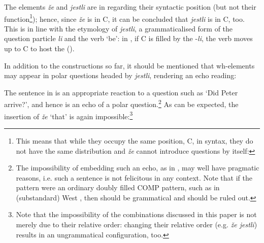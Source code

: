 \documentclass[output=paper,modfonts, hidelinks, newtxmath]{langscibook}
\begin{document}
\noindent The elements \textit{že} and \textit{jestli} are in  regarding their syntactic position (but not their function\footnote{This means that while they occupy the same position, C, in syntax, they do not have the same distribution and \textit{že} cannot introduce questions by itself:

\z 

}); hence, since \textit{že} is in C, it can be concluded that \textit{jestli} is in C, too. This is in line with the etymology of \textit{jestli}, a grammaticalised form of the question particle \textit{li} and the verb `be': in , if C is filled by the  -\textit{li}, the verb moves up to C to host the  (\citealt{schwabe2004}).

In addition to the constructions so far, it should be mentioned that wh-elements may appear in polar questions headed by \textit{jestli}, rendering an echo reading:

\ea
	\z 
\z 

\noindent The sentence in  is an appropriate reaction to a question such as `Did Peter arrive?', and hence is an echo of a polar question.\footnote{The impossibility of embedding such an echo, as in , may well have pragmatic reasons, i.e. such a sentence is not felicitous in any context. Note that if the  pattern were an ordinary doubly filled COMP pattern, such as in (substandard) West , then  should be grammatical and  should be ruled out.} As can be expected, the insertion of \textit{že} `that' is again impossible:\footnote{Note that the impossibility of the combinations discussed in this paper is not merely due to their relative order: changing their relative order (e.g. \textit{že jestli}) results in an ungrammatical configuration, too.}
\end{document}
